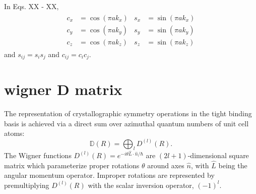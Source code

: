 \documentclass[twocolumn,showpacs,preprintnumbers,superscriptaddress,prb,floatfix,aps,10pt]{revtex4-1}
\newcommand*{\wignerD}{\mathbb{D}(R)}
\newcommand*{\wignerDl}{D^{(l)}(R)}
\begin{document}
In Eqs. XX - XX,
\begin{align}
\begin{split}
c_x &= \cos(\pi a k_x) \\
c_y &= \cos(\pi a k_y) \\
c_z &= \cos(\pi a k_z)
\end{split}
\begin{split}
s_x &= \sin(\pi a k_x) \\
s_y &= \sin(\pi a k_y) \\
s_z &= \sin(\pi a k_z)
\end{split}
\end{align}
and
$s_{ij} = s_i s_j$ and $c_{ij} = c_i c_j$.





%
%
\section{wigner D matrix} \label{appendix:wigner}

The representation of crystallographic symmetry operations in the tight binding basis is achieved via a direct sum over azimuthal quantum numbers of unit cell atoms:
\begin{equation}
\wignerD = \bigoplus_l \wignerDl.
\end{equation} 
The Wigner functions $\wignerDl =  e^{-i\theta\hat{L}\cdot\hat{n}/\hbar}$ are $(2l+1)$-dimensional square matrix which parameterize proper rotations $\theta$ around axes $\hat{n}$, with $\hat{L}$ being the angular momentum operator. %
Improper rotations are represented by premultiplying $\wignerDl$ with the scalar inversion operator, $(-1)^l$. \cite{sharma_general_1979,el-batanouny_symmetry_2008} %
\end{document}
